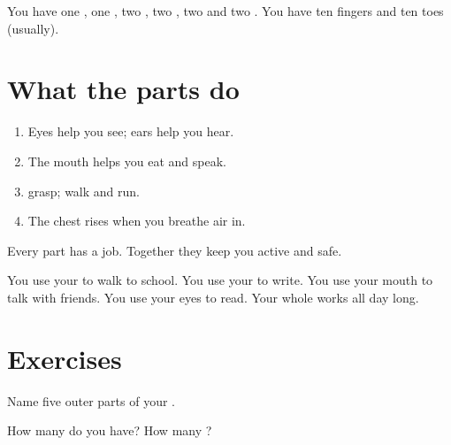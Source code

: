 \begin{example}[Counting]\label{ex:g1:my-body:count}
You have one , one , two , two , two  and two
. You have ten fingers and ten toes (usually).
\end{example}

\section{What the parts do}

\begin{method}\label{met:g1:my-body:jobs}
\begin{enumerate}
  \item Eyes help you see; ears help you hear.
  \item The mouth helps you eat and speak.
  \item {} grasp;  walk and run.
  \item The chest rises when you breathe air in.
\end{enumerate}
Every part has a job. Together they keep you active and safe.
\end{method}

\begin{example}\label{ex:g1:my-body:day}
You use your  to walk to school. You use your  to write.
You use your mouth to talk with friends. You use your eyes to read.
Your whole  works all day long.
\end{example}

\section{Exercises}

\begin{exercise}[$\star$]\label{exo:g1:my-body:1}
Name five outer parts of your .
\end{exercise}

\begin{exercise}[$\star$]\label{exo:g1:my-body:2}
How many  do you have? How many ?
\end{exercise}

